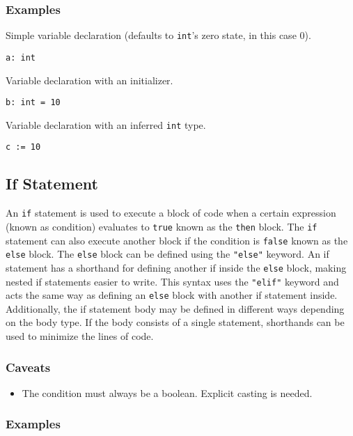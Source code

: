 \subsubsection{Examples}

Simple variable declaration (defaults to \texttt{int}'s zero state, in this case 0).
\begin{lstlisting}
a: int
\end{lstlisting}
Variable declaration with an initializer.
\begin{lstlisting}
b: int = 10
\end{lstlisting}
Variable declaration with an inferred \texttt{int} type.
\begin{lstlisting}
c := 10
\end{lstlisting}

\subsection{If Statement}

An \texttt{if} statement is used to execute a block of code when a certain expression (known as condition) evaluates
to \texttt{true} known as the \texttt{then} block.
The \texttt{if} statement can also execute another block if the condition is \texttt{false} known as the \texttt{else} block.
The \texttt{else} block can be defined using the \texttt{"else"} keyword.
An if statement has a shorthand for defining another if inside the \texttt{else} block, making nested if statements easier to write.
This syntax uses the \texttt{"elif"} keyword and acts the same way as defining an \texttt{else} block with another if statement inside.
Additionally, the if statement body may be defined in different ways depending on the body type. If the body consists of a single statement,
shorthands can be used to minimize the lines of code.

\subsubsection{Caveats}

\begin{itemize}
    \item The condition must always be a boolean. Explicit casting is needed.
\end{itemize}

\subsubsection{Examples}

